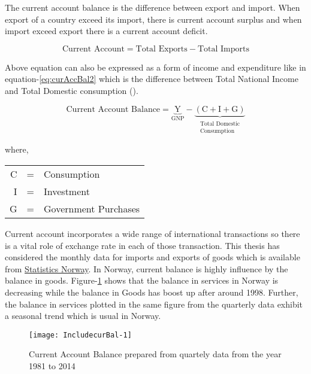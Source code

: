 \documentclass[12pt, lot, lof]{thesis}\usepackage[]{graphicx}\usepackage[]{color}
\makeatletter
\def\maxwidth{ %
  \ifdim\Gin@nat@width>\linewidth
    \linewidth
  \else
    \Gin@nat@width
  \fi
}
\makeatother
\begin{document}
The current account balance is the difference between export and import. When export of a country exceed its import, there is current account surplus and when import exceed export there is a current account deficit.

\begin{equation}
\label{eq:curAccBal}
\text{Current Account}=\text{Total Exports}-\text{Total Imports}
\end{equation}

Above equation can also be expressed as a form of income and expenditure like in equation-\ref{eq:curAccBal2} which is the difference between Total National Income and Total Domestic consumption (\cite{krugman2006international}).

\begin{equation}
\label{eq:curAccBal2}
\text{Current Account Balance}=
\underbrace{\text{Y}}_\text{GNP}-
\underbrace{\left(\text{C}+\text{I}+\text{G}\right)}_{\substack{\text{Total Domestic}\\\text{Consumption}}}
\end{equation}

where,

\begin{tabular}{rcl}
C & = & Consumption \\
I & = & Investment \\
G & = & Government Purchases \\
\end{tabular}


Current account incorporates a wide range of international transactions so there is a vital role of exchange rate in each of those transaction. This thesis has considered the monthly data for imports and exports of goods which is available from \href{http://ssb.no}{Statistics Norway}. In Norway, current balance is highly influence by the balance in goods. Figure-\ref{fig:curBal} shows that the balance in services in Norway is decreasing while the balance in Goods has boost up after around 1998. Further, the balance in services plotted in the same figure from the quarterly data exhibit a seasonal trend which is usual in Norway.
\begin{Schunk}
\begin{figure}

{\centering \texttt{[image: IncludecurBal-1]} 

}

\caption[Current Account Balance prepared from quartely data from the year 1981 to 2014]{Current Account Balance prepared from quartely data from the year 1981 to 2014\label{fig:curBal}}
\end{figure}
\end{Schunk}
\end{document}

